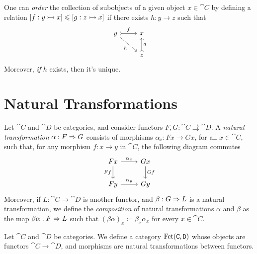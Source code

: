 \begin{example}
\label{exp:order-subobject}
One can \emph{order} the collection of subobjects of a given object \(x \in \cat
C\) by defining a relation \([f: y \rightarrowtail x] \leqslant [g: z \rightarrowtail x]\) if there
exists \(h: y \to z\) such that
\[
  \begin{tikzcd}
    y \ar[r, tail, "f"] \ar[rd, dashed, swap, "h"] &x \\
    &z \ar[u, tail, swap, "g"]
  \end{tikzcd}
\]
Moreover, \emph{if} \(h\) exists, then it's unique.
\end{example}


\section{Natural Transformations}

\begin{definition}
\label{def:natural-transformation}
Let \(\cat C\) and \(\cat D\) be categories, and consider functors \(F, G:
\cat C \rightrightarrows \cat D\). A \emph{natural transformation} \(\alpha: F
\Rightarrow G\) consists of morphisms \(\alpha_x: F x \to G x\), for all \(x \in \cat
C\), such that, for any morphism \(f: x \to y\) in \(\cat C\), the following
diagram commutes
\[
  \begin{tikzcd}
    F x \ar[r, "\alpha_x"] \ar[d, swap, "F f"]
    &G x \ar[d, "G f"] \\
    F y \ar[r, "\alpha_y"] &Gy
  \end{tikzcd}
\]
Moreover, if \(L: \cat C \to \cat D\) is another functor, and \(\beta: G \Rightarrow
L\) is a natural transformation, we define the \emph{composition} of natural
transformations \(\alpha\) and \(\beta\) as the map \(\beta \alpha: F \Rightarrow L\)
such that \((\beta \alpha)_x \coloneq \beta_x \alpha_x\) for every \(x \in \cat
C\).
\end{definition}

\begin{definition}
\label{def:functor-category}
Let \(\cat C\) and \(\cat D\) be categories. We define a category \(\operatorname{Fct}(\texttt C,
\texttt D)\) whose objects are functors \(\cat C \to \cat D\), and morphisms are
natural transformations between functors.
\end{definition}

